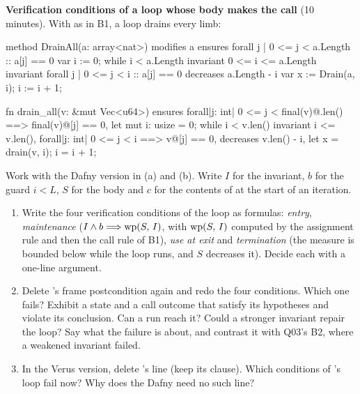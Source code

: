 \documentclass[11pt]{article}
\begin{document}
\begin{problem}\label{prob:B2}
\textbf{Verification conditions of a loop whose body makes the call} (10
minutes). With  as in B1, a loop drains every limb:
\begin{dafnycode}
method DrainAll(a: array<nat>)
  modifies a
  ensures forall j | 0 <= j < a.Length :: a[j] == 0
{
  var i := 0;
  while i < a.Length
    invariant 0 <= i <= a.Length
    invariant forall j | 0 <= j < i :: a[j] == 0
    decreases a.Length - i
  {
    var x := Drain(a, i);
    i := i + 1;
  }
}
\end{dafnycode}
\begin{veruscode}
fn drain_all(v: &mut Vec<u64>)
    ensures
        forall|j: int| 0 <= j < final(v)@.len() ==> final(v)@[j] == 0,
{
    let mut i: usize = 0;
    while i < v.len()
        invariant
            i <= v.len(),
            forall|j: int| 0 <= j < i ==> v@[j] == 0,
        decreases v.len() - i,
    {
        let x = drain(v, i);
        i = i + 1;
    }
}
\end{veruscode}
Work with the Dafny version in (a) and (b). Write $I$ for the invariant,
$b$ for the guard $i < L$, $S$ for the body and $c$ for the contents of
 at the start of an iteration.
\begin{enumerate}
\item[(a)] Write the four verification conditions of the loop as formulas:
  \emph{entry}, \emph{maintenance} ($I \wedge b \Longrightarrow \mathrm{wp}(S,\,I)$, with
  $\mathrm{wp}(S,\,I)$ computed by the assignment rule and then the call rule of B1),
  \emph{use at exit} and \emph{termination} (the measure is bounded below while
  the loop runs, and $S$ decreases it). Decide each with a one-line argument.
\item[(b)] Delete 's frame postcondition again and redo the four
  conditions. Which one fails? Exhibit a state and a call outcome that satisfy
  its hypotheses and violate its conclusion. Can a run reach it? Could a
  stronger invariant repair the loop? Say what the failure is about, and
  contrast it with Q03's B2, where a weakened invariant failed.
\item[(c)] In the Verus version, delete 's line
   (keep its  clause). Which
  conditions of 's loop fail now? Why does the Dafny 
  need no such line?
\end{enumerate}
\end{problem}
\end{document}
